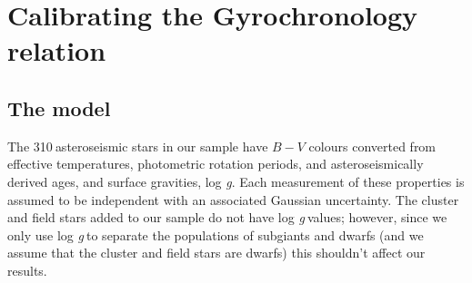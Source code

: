 \documentclass[10pt,preprint]{aastex}
\newcommand{\logg}{log \emph{g}}
\newcommand{\nastero}{310}
\newcommand{\ntotal}{521~}
\begin{document}


\section{Calibrating the Gyrochronology relation}
\label{sec:gyro_cal}

\subsection{The model}

The \nastero$~$asteroseismic stars in our sample have $B-V$ colours converted from effective temperatures, photometric rotation periods, and asteroseismically derived ages, and surface gravities, \logg.
 Each measurement of these properties is assumed to be independent with an associated Gaussian uncertainty.
The cluster and field stars added to our sample do not have \logg$~$values; however, since we only use \logg$~$to separate the populations of subgiants and dwarfs (and we assume that the cluster and field stars are dwarfs) this shouldn't affect our results.
\end{document}

